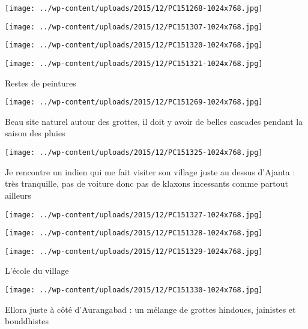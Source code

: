  \newline
 \newline
\centerline{\texttt{[image: ../wp-content/uploads/2015/12/PC151268-1024x768.jpg]} } 
 \newline
 \newline
\centerline{\texttt{[image: ../wp-content/uploads/2015/12/PC151307-1024x768.jpg]} } 
 \newline
 \newline
\centerline{\texttt{[image: ../wp-content/uploads/2015/12/PC151320-1024x768.jpg]} } 
 \newline
 \newline
\centerline{\texttt{[image: ../wp-content/uploads/2015/12/PC151321-1024x768.jpg]} } 
 \newline
 Restes de peintures \newline
 \newline
\centerline{\texttt{[image: ../wp-content/uploads/2015/12/PC151269-1024x768.jpg]} } 
 \newline
 Beau site naturel autour des grottes, il doit y avoir de belles cascades pendant la saison des pluies \newline
 \newline
\centerline{\texttt{[image: ../wp-content/uploads/2015/12/PC151325-1024x768.jpg]} } 
 \newline
 Je rencontre un indien qui me fait visiter son village juste au dessus d'Ajanta : très tranquille, pas de voiture donc pas de klaxons incessants comme partout ailleurs \newline
 \newline
\centerline{\texttt{[image: ../wp-content/uploads/2015/12/PC151327-1024x768.jpg]} } 
 \newline
 \newline
\centerline{\texttt{[image: ../wp-content/uploads/2015/12/PC151328-1024x768.jpg]} } 
 \newline
 \newline
\centerline{\texttt{[image: ../wp-content/uploads/2015/12/PC151329-1024x768.jpg]} } 
 \newline
 L'école du village \newline
 \newline
\centerline{\texttt{[image: ../wp-content/uploads/2015/12/PC151330-1024x768.jpg]} } 
 \newline
 Ellora juste à côté d'Aurangabad : un mélange de grottes hindoues, jainistes et bouddhistes \newline
